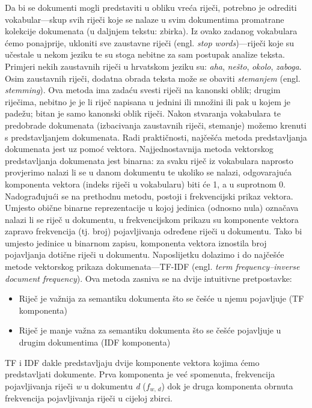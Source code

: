 \documentclass[times, utf8, zavrsni]{fer}
\begin{document}
Da bi se dokumenti mogli predstaviti u obliku vreća riječi, potrebno je odrediti vokabular—skup svih riječi koje se nalaze u svim dokumentima promatrane kolekcije dokumenata (u daljnjem tekstu: zbirka). Iz ovako zadanog vokabulara ćemo ponajprije, ukloniti sve zaustavne riječi (engl. \textit{stop words})—riječi koje su učestale u nekom jeziku te su stoga nebitne za sam postupak analize teksta. Primjeri nekih zaustavnih riječi u hrvatskom jeziku su: \textit{aha}, \textit{nešto}, \textit{okolo}, \textit{zaboga}. Osim zaustavnih riječi, dodatna obrada teksta može se obaviti \textit{stemanjem} (engl. \textit{stemming}). Ova metoda ima zadaću svesti riječi na kanonski oblik; drugim riječima, nebitno je je li riječ napisana u jednini ili množini ili pak u kojem je padežu; bitan je samo kanonski oblik riječi.
Nakon stvaranja vokabulara te predobrade dokumenata (izbacivanja zaustavnih riječi, stemanje) možemo krenuti s predstavljanjem dokumenata. Radi praktičnosti, najčešća metoda predstavljanja dokumenata jest uz pomoć vektora.
Najjednostavnija metoda vektorskog predstavljanja dokumenata jest binarna: za svaku riječ iz vokabulara naprosto provjerimo nalazi li se u danom dokumentu te ukoliko se nalazi, odgovarajuća komponenta vektora (indeks riječi u vokabularu) biti će 1, a u suprotnom 0. Nadograđujući se na prethodnu metodu, postoji i frekvencijski prikaz vektora. Umjesto obične binarne reprezentacije u kojoj jedinica (odnosno nula) označava nalazi li se riječ u dokumentu, u frekvencijskom prikazu su komponente vektora zapravo frekvencija (tj. broj) pojavljivanja određene riječi u dokumentu. Tako bi umjesto jedinice u binarnom zapisu, komponenta vektora iznostila broj pojavljanja dotične riječi u dokumentu. Naposlijetku dolazimo i do najčešće metode vektorskog prikaza dokumenata—TF-IDF (engl. \textit{term frequency–inverse document frequency}). Ova metoda zasniva se na dvije intuitivne pretpostavke:
\begin{itemize}
\item Riječ je važnija za semantiku dokumenta što se češće u njemu pojavljuje (TF komponenta)
\item Riječ je manje važna za semantiku dokumenta što se češće pojavljuje u drugim dokumentima (IDF komponenta)
\end{itemize}
TF i IDF dakle predstavljaju dvije komponente vektora kojima ćemo predstavljati dokumente. Prva komponenta je već spomenuta, frekvencija pojavljivanja riječi \textit{w} u dokumentu \textit{d} ($f_\textit{w, d}$) dok je druga komponenta obrnuta frekvencija pojavljivanja riječi u cijeloj zbirci.
\end{document}
